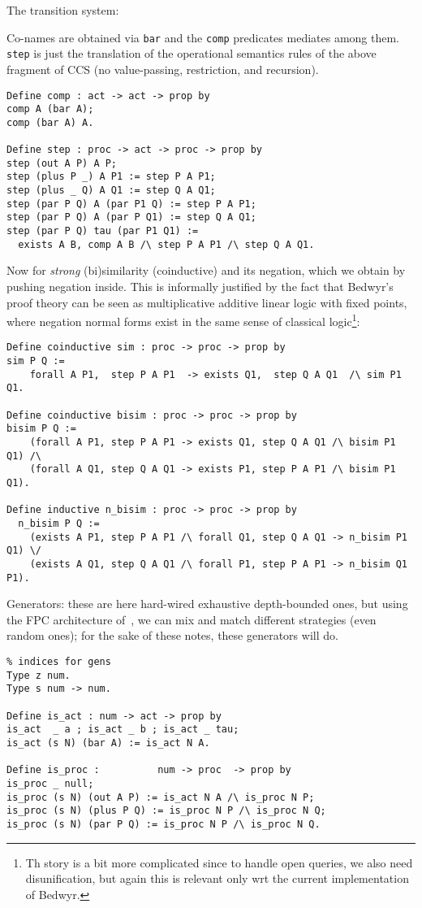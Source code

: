 \documentclass[a4paper]{easychair}
\begin{document}
  The transition system:
  \begin{changebar}
    Co-names are obtained via \texttt{bar} and the \texttt{comp}
    predicates mediates among them. \texttt{step} is just the
    translation of the operational semantics rules of the above
    fragment of CCS (no value-passing, restriction, and recursion).
  \end{changebar}
\begin{lstlisting}
Define comp : act -> act -> prop by
comp A (bar A);
comp (bar A) A.

Define step : proc -> act -> proc -> prop by
step (out A P) A P;
step (plus P _) A P1 := step P A P1;
step (plus _ Q) A Q1 := step Q A Q1;
step (par P Q) A (par P1 Q) := step P A P1;
step (par P Q) A (par P Q1) := step Q A Q1;
step (par P Q) tau (par P1 Q1) :=
  exists A B, comp A B /\ step P A P1 /\ step Q A Q1.
\end{lstlisting}

  Now for \emph{strong} (bi)similarity (coinductive) and its negation,
  which we obtain by pushing negation inside. This is informally
  justified by the fact that Bedwyr's proof theory can be seen as
  multiplicative additive linear logic with fixed points, where
  negation normal forms exist in the same sense of classical logic\footnote{Th story is a bit more complicated since to handle open queries, we also need disunification, but again this is relevant only wrt the current implementation of Bedwyr.}:
\begin{lstlisting}
Define coinductive sim : proc -> proc -> prop by
sim P Q :=
	forall A P1,  step P A P1  -> exists Q1,  step Q A Q1  /\ sim P1 Q1.

Define coinductive bisim : proc -> proc -> prop by
bisim P Q :=
    (forall A P1, step P A P1 -> exists Q1, step Q A Q1 /\ bisim P1 Q1) /\
    (forall A Q1, step Q A Q1 -> exists P1, step P A P1 /\ bisim P1 Q1).

Define inductive n_bisim : proc -> proc -> prop by
  n_bisim P Q :=
	(exists A P1, step P A P1 /\ forall Q1, step Q A Q1 -> n_bisim P1 Q1) \/
	(exists A Q1, step Q A Q1 /\ forall P1, step P A P1 -> n_bisim Q1 P1).
\end{lstlisting}

Generators: these are here hard-wired exhaustive depth-bounded
ones, but using the FPC architecture of~\cite{Blanco0M19}, we can mix
and match different strategies (even random ones); for the sake of
these notes, these generators will do.
\begin{lstlisting}
% indices for gens
Type z num.
Type s num -> num.

Define is_act : num -> act -> prop by
is_act  _ a ; is_act _ b ; is_act _ tau;
is_act (s N) (bar A) := is_act N A. 

Define is_proc :          num -> proc  -> prop by
is_proc _ null;
is_proc (s N) (out A P) := is_act N A /\ is_proc N P;
is_proc (s N) (plus P Q) := is_proc N P /\ is_proc N Q;
is_proc (s N) (par P Q) := is_proc N P /\ is_proc N Q.
\end{lstlisting}
\end{document}
